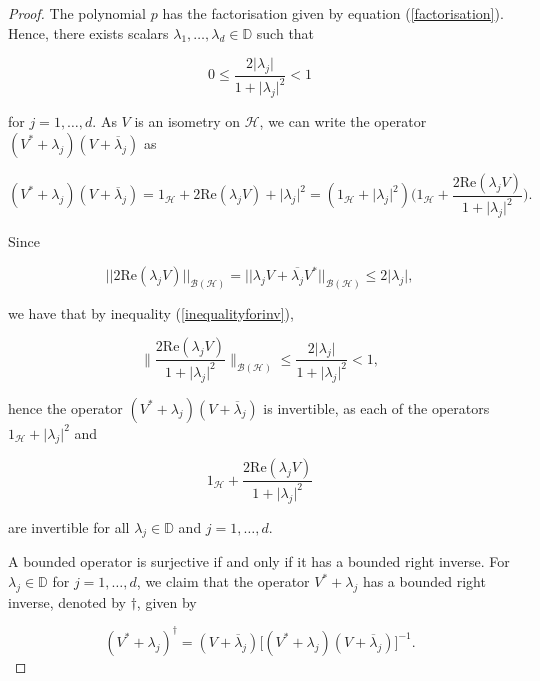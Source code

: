 \documentclass[10pt, reqno]{amsart}
\theoremstyle{definition}
\numberwithin{equation}{section}
\begin{document}
\begin{proof}
The polynomial $p$ has the factorisation given by equation (\ref{factorisation}). Hence, there exists scalars $\lambda_{1},\hdots,\lambda_{d}\in\mathbb{D}$ such that

\begin{equation}\label{inequalityforinv}
0\leq \dfrac{2\lvert\lambda_{j}\rvert}{1+\lvert\lambda_{j}\rvert^{2}}<1
\end{equation}

\noindent for $j=1,\hdots,d$. As $V$ is an isometry on $\mathcal{H}$, we can write the operator $(V^{*}+\lambda_{j})(V+\overline{\lambda}_{j})$ as

$$
    (V^{*}+\lambda_{j})(V+\overline{\lambda}_{j}) = 1_{\mathcal{H}} + 2\mathrm{Re}(\lambda_{j} V) + \lvert \lambda_{j} \rvert^{2} =(1_{\mathcal{H}}+\lvert\lambda_{j}\rvert^{2})\bigg(1_{\mathcal{H}}+\dfrac{2\mathrm{Re}(\lambda_{j} V)}{1+\lvert\lambda_{j}\rvert^{2}}\bigg).$$

\noindent Since

$$ || 2\mathrm{Re}(\lambda_{j} V) ||_{\mathcal{B}(\mathcal{H})} = || \lambda_{j} V + \overline{\lambda_{j}} V^{*} ||_{\mathcal{B}(\mathcal{H})} \leq 2 \lvert\lambda_{j} \rvert, $$

\noindent we have that by inequality (\ref{inequalityforinv}), 

\begin{equation}\label{inequalityforinv2}
\Bigg\|\dfrac{2\mathrm{Re}(\lambda_{j} V)}{1+\lvert\lambda_{j}\rvert^{2}}\Bigg\|_{\mathcal{B}(\mathcal{H})}\leq \dfrac{2\lvert\lambda_{j}\rvert}{1+\lvert\lambda_{j}\rvert^{2}} < 1,
\end{equation}

\noindent hence the operator $(V^{*}+\lambda_{j})(V+\overline{\lambda}_{j})$ is invertible, as each of the operators $1_{\mathcal{H}}+\lvert\lambda_{j}\rvert^{2}$ and

$$ 1_{\mathcal{H}}+\dfrac{2\mathrm{Re}(\lambda_{j} V)}{1+\lvert\lambda_{j}\rvert^{2}}$$ 

\noindent are invertible for all $\lambda_{j}\in\mathbb{D}$ and $j=1,\hdots,d$.

 A bounded operator is surjective if and only if it has a bounded right inverse. For $\lambda_{j}\in\mathbb{D}$ for $j=1,\hdots,d$, we claim that the operator $V^{*}+\lambda_{j}$ has a bounded right inverse, denoted by $\dagger$, given by


$$(V^{*}+\lambda_{j})^{\dagger}=(V+\overline{\lambda}_{j})\bigg[(V^{*}+\lambda_{j})(V+\overline{\lambda}_{j})\bigg]^{-1}.$$


\end{proof}
\end{document}
